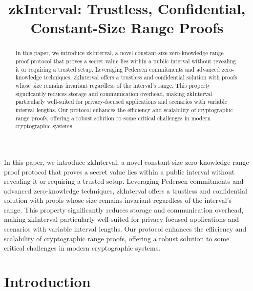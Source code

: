 \documentclass[version=preprint]{iacrcc}
\title[running = {zkInterval},
      ]{zkInterval: Trustless, Confidential, Constant-Size Range Proofs}
\begin{document}
\maketitle


\begin{abstract}
  In this paper, we introduce zkInterval, a novel constant-size zero-knowledge range proof protocol that proves a secret value lies within a public interval without revealing it or requiring a trusted setup. Leveraging Pedersen commitments and advanced zero-knowledge techniques, zkInterval offers a trustless and confidential solution with proofs whose size remains invariant regardless of the interval's range. This property significantly reduces storage and communication overhead, making zkInterval particularly well-suited for privacy-focused applications and scenarios with variable interval lengths. Our protocol enhances the efficiency and scalability of cryptographic range proofs, offering a robust solution to some critical challenges in modern cryptographic systems.
\end{abstract}

\begin{textabstract}
  In this paper, we introduce zkInterval, a novel constant-size zero-knowledge range proof protocol that proves a secret value lies within a public interval without revealing it or requiring a trusted setup. Leveraging Pedersen commitments and advanced zero-knowledge techniques, zkInterval offers a trustless and confidential solution with proofs whose size remains invariant regardless of the interval's range. This property significantly reduces storage and communication overhead, making zkInterval particularly well-suited for privacy-focused applications and scenarios with variable interval lengths. Our protocol enhances the efficiency and scalability of cryptographic range proofs, offering a robust solution to some critical challenges in modern cryptographic systems.
\end{textabstract}

\section{Introduction}
\end{document}

